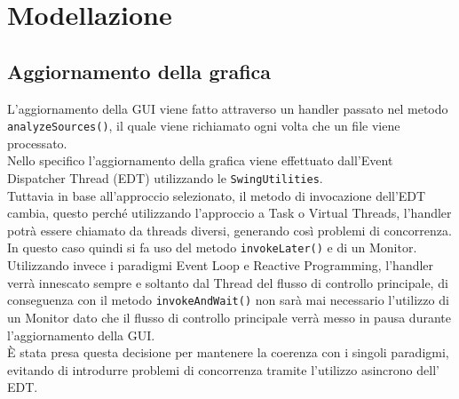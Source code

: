 \documentclass{article}
\begin{document}
    \section{Modellazione}


    \subsection*{Aggiornamento della grafica}

    L'aggiornamento della GUI viene fatto attraverso un handler passato nel metodo \texttt{analyzeSources()}, il quale viene richiamato ogni volta che un file viene processato.
    \\
    Nello specifico l'aggiornamento della grafica viene effettuato dall'Event Dispatcher Thread (EDT) utilizzando le \texttt{SwingUtilities}.
    \\
    Tuttavia in base all'approccio selezionato, il metodo di invocazione dell'EDT cambia, questo perché
    utilizzando l'approccio a Task o Virtual Threads, l'handler potrà essere chiamato da threads diversi, generando così problemi di concorrenza. In questo caso quindi si fa uso del metodo \texttt{invokeLater()} e di un Monitor.
    \\
    Utilizzando invece i paradigmi Event Loop e Reactive Programming, l'handler verrà innescato sempre e soltanto dal Thread del flusso di controllo principale, di conseguenza con il metodo \texttt{invokeAndWait()} non sarà mai necessario l'utilizzo di un Monitor dato che il flusso di controllo principale verrà messo in pausa durante l'aggiornamento della GUI.
    \\
    È stata presa questa decisione per mantenere la coerenza con i singoli paradigmi, evitando di introdurre problemi di concorrenza tramite l'utilizzo asincrono dell' EDT.
    \\
\end{document}
